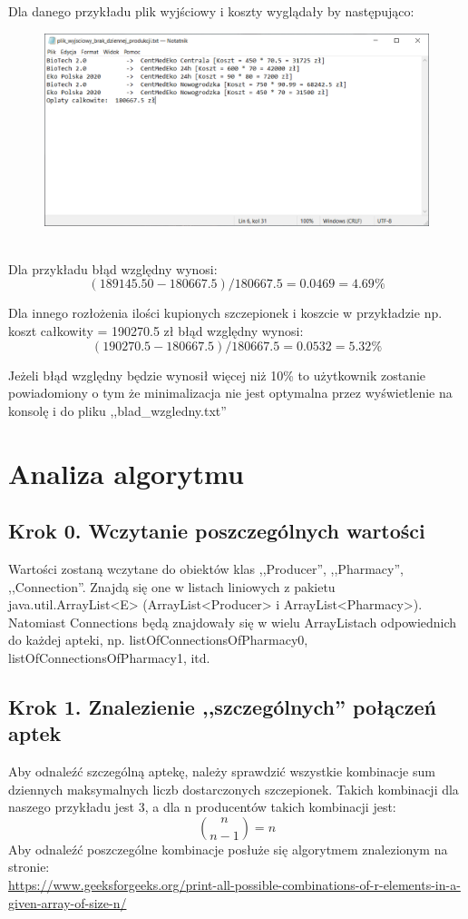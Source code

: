 \documentclass{article}
\begin{document}
Dla danego przykładu plik wyjściowy i koszty wyglądały by następująco:
\begin{figure} [hbt!]
    \includegraphics[width=16cm,center]{images/plik_wyjsciowy_brak_dziennej_produkcji.PNG}
\end{figure}
\\
Dla przykładu błąd względny wynosi:
\[ (189145.50 - 180667.5) / 180667.5 = 0.0469 = 4.69\%\]

Dla innego rozłożenia ilości kupionych szczepionek i koszcie w przykładzie np. koszt całkowity = 190270.5 zł błąd względny wynosi:
\[ (190270.5 - 180667.5) / 180667.5 = 0.0532 = 5.32\%\]

Jeżeli błąd względny będzie wynosił więcej niż 10\% to użytkownik zostanie powiadomiony o tym że minimalizacja nie jest optymalna przez wyświetlenie na konsolę i do pliku ,,blad\_wzgledny.txt''

\section{Analiza algorytmu}
\subsection{Krok 0. Wczytanie poszczególnych wartości}
Wartości zostaną wczytane do obiektów klas ,,Producer'', ,,Pharmacy'', ,,Connection''. Znajdą się one w listach liniowych z pakietu java.util.ArrayList<E> (ArrayList<Producer> i ArrayList<Pharmacy>).
Natomiast Connections będą znajdowały się w wielu ArrayListach odpowiednich do każdej apteki, np. listOfConnectionsOfPharmacy0, listOfConnectionsOfPharmacy1, itd.

\subsection{Krok 1. Znalezienie ,,szczególnych'' połączeń aptek}
Aby odnaleźć szczególną aptekę, należy sprawdzić wszystkie kombinacje sum dziennych maksymalnych liczb dostarczonych szczepionek. Takich kombinacji dla naszego przykładu jest 3, a dla n producentów takich kombinacji jest:
\[ {n \choose n - 1} = n \]
Aby odnaleźć poszczególne kombinacje posłuże się algorytmem znalezionym na stronie: \\
\url{https://www.geeksforgeeks.org/print-all-possible-combinations-of-r-elements-in-a-given-array-of-size-n/}
\end{document}
